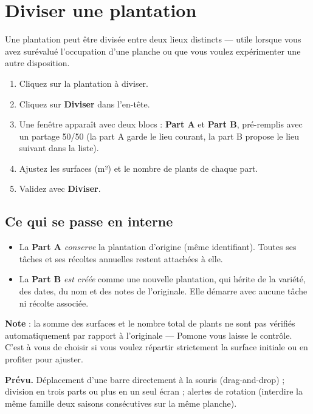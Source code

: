 \section{Diviser une plantation}

Une plantation peut être divisée entre deux lieux distincts — utile lorsque vous avez surévalué l'occupation d'une planche ou que vous voulez expérimenter une autre disposition.

\begin{enumerate}
  \item Cliquez sur la plantation à diviser.
  \item Cliquez sur \textbf{Diviser} dans l'en-tête.
  \item Une fenêtre apparaît avec deux blocs : \textbf{Part A} et \textbf{Part B}, pré-remplis avec un partage 50/50 (la part A garde le lieu courant, la part B propose le lieu suivant dans la liste).
  \item Ajustez les surfaces (m²) et le nombre de plants de chaque part.
  \item Validez avec \textbf{Diviser}.
\end{enumerate}

\subsection*{Ce qui se passe en interne}

\begin{itemize}
  \item La \textbf{Part A} \emph{conserve} la plantation d'origine (même identifiant). Toutes ses tâches et ses récoltes annuelles restent attachées à elle.
  \item La \textbf{Part B} \emph{est créée} comme une nouvelle plantation, qui hérite de la variété, des dates, du nom et des notes de l'originale. Elle démarre avec aucune tâche ni récolte associée.
\end{itemize}

\textbf{Note} : la somme des surfaces et le nombre total de plants ne sont pas vérifiés automatiquement par rapport à l'originale — Pomone vous laisse le contrôle. C'est à vous de choisir si vous voulez répartir strictement la surface initiale ou en profiter pour ajuster.

\begin{notebox}
\textbf{Prévu.} Déplacement d'une barre directement à la souris (drag-and-drop) ; division en trois parts ou plus en un seul écran ; alertes de rotation (interdire la même famille deux saisons consécutives sur la même planche).
\end{notebox}
